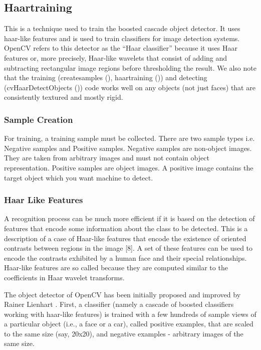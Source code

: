 \subsection{Haartraining}
This is a technique used to train the boosted cascade object detector. It uses haar-like features and is used to train classifiers for image detection systems. OpenCV refers to this detector as the “Haar classifier” because it uses Haar features or, more precisely, Haar-like wavelets that consist of adding and subtracting rectangular image regions before thresholding the result. We also note that the training (createsamples (), haartraining ()) and detecting (cvHaarDetectObjects ()) code works well on any objects (not just faces) that are consistently textured and mostly rigid.

\subsubsection{Sample Creation}
For training, a training sample must be collected. There are two sample types i.e. Negative samples and Positive samples.
Negative samples are non-object images. They are taken from arbitrary images and must not contain object representation.
Positive samples are object images. A positive image contains the target object which you want machine to detect.

\subsubsection{Haar Like Features}
A recognition process can be much more efficient if it is based on the detection of features that encode some information about the class to be detected. This is a description of a case of Haar-like features that encode the existence of oriented contrasts between regions in the image [8]. A set of these features can be used to encode the contrasts exhibited by a human face and their special relationships. Haar-like features are so called because they are computed similar to the coefficients in Haar wavelet transforms. 

The object detector of OpenCV has been initially proposed and improved by Rainer Lienhart  \cite{articleY}. First, a classifier (namely a cascade of boosted classifiers working with haar-like features) is trained with a few hundreds of sample views of a particular object (i.e., a face or a car), called positive examples, that are scaled to the same size (say, 20x20), and negative examples - arbitrary images of the same size. 

